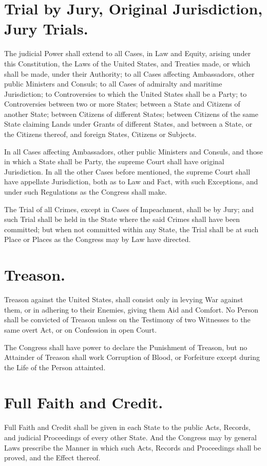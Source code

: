 \documentclass[12pt]{constitution}
\begin{document}
\section{Trial by Jury, Original Jurisdiction, Jury Trials.}
The judicial Power shall extend to all Cases, in Law and Equity, arising under
this Constitution, the Laws of the United States, and Treaties made, or which
shall be made, under their Authority; to all Cases affecting Ambassadors, other
public Ministers and Consuls; to all Cases of admiralty and maritime
Jurisdiction; to Controversies to which the United States shall be a Party; to
Controversies between two or more States; between a State and Citizens of
another State; between Citizens of different States; between Citizens of the
same State claiming Lands under Grants of different States, and between a
State, or the Citizens thereof, and foreign States, Citizens or Subjects.

In all Cases affecting Ambassadors, other public Ministers and Consuls, and
those in which a State shall be Party, the supreme Court shall have original
Jurisdiction. In all the other Cases before mentioned, the supreme Court shall
have appellate Jurisdiction, both as to Law and Fact, with such Exceptions, and
under such Regulations as the Congress shall make.

The Trial of all Crimes, except in Cases of Impeachment, shall be by Jury; and
such Trial shall be held in the State where the said Crimes shall have been
committed; but when not committed within any State, the Trial shall be at such
Place or Places as the Congress may by Law have directed.


\section{Treason.}
Treason against the United States, shall consist only in levying War against
them, or in adhering to their Enemies, giving them Aid and Comfort. No Person
shall be convicted of Treason unless on the Testimony of two Witnesses to the
same overt Act, or on Confession in open Court.

The Congress shall have power to declare the Punishment of Treason, but no
Attainder of Treason shall work Corruption of Blood, or Forfeiture except
during the Life of the Person attainted.




\section{Full Faith and Credit.}
Full Faith and Credit shall be given in each State to the public Acts, Records,
and judicial Proceedings of every other State. And the Congress may by general
Laws prescribe the Manner in which such Acts, Records and Proceedings shall be
proved, and the Effect thereof.
\end{document}
